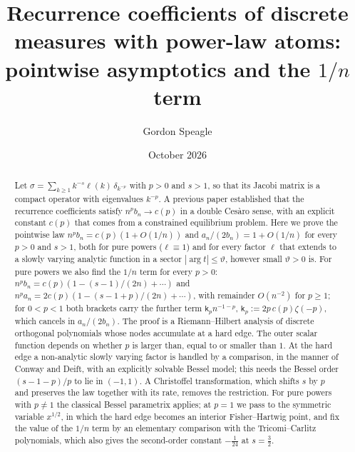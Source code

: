 
\title[Recurrence coefficients with power-law atoms]{Recurrence coefficients of discrete measures with power-law
atoms: pointwise asymptotics and the $1/n$ term}
\author{Gordon Speagle}
\date{October 2026}

\begin{abstract}
Let $\sigma=\sum_{k\ge1}k^{-s}\ell(k)\,\delta_{k^{-p}}$ with $p>0$ and $s>1$, so that its Jacobi matrix is a compact
operator with eigenvalues $k^{-p}$. A previous paper established that the recurrence coefficients satisfy
$n^pb_n\to c(p)$ in a double Ces\`aro sense, with an explicit constant $c(p)$ that comes from a constrained equilibrium
problem. Here we prove the pointwise law $n^pb_n=c(p)(1+O(1/n))$ and $a_n/(2b_n)=1+O(1/n)$ for every $p>0$ and $s>1$,
both for pure powers ($\ell\equiv1$) and for every factor $\ell$ that extends to a slowly varying analytic function in a
sector $|\arg t|\le\vartheta$, however small $\vartheta>0$ is. For pure powers we also find the $1/n$ term for every
$p>0$: $n^pb_n=c(p)(1-(s-1)/(2n)+\dotsb)$ and $n^pa_n=2c(p)(1-(s-1+p)/(2n)+\dotsb)$, with remainder $O(n^{-2})$ for
$p\ge1$; for $0<p<1$ both brackets carry the further term $\mathsf k_pn^{-1-p}$, $\mathsf k_p:=2p\,c(p)\zeta(-p)$,
which cancels in $a_n/(2b_n)$. The proof
is a Riemann--Hilbert analysis of discrete orthogonal polynomials whose nodes accumulate at a hard edge. The outer scalar
function depends on whether $p$ is larger than, equal to or smaller than $1$. At the hard edge a non-analytic slowly
varying factor is handled by a comparison, in the manner of Conway and Deift, with an explicitly solvable Bessel model;
this needs the Bessel order $(s-1-p)/p$ to lie in $(-1,1)$. A Christoffel transformation, which shifts $s$ by $p$ and
preserves the law together with its rate, removes the restriction. For pure powers with $p\ne1$ the classical Bessel
parametrix applies; at $p=1$ we pass to the symmetric variable $x^{1/2}$, in which the hard edge becomes an interior
Fisher--Hartwig point, and fix the value of the $1/n$ term by an elementary comparison with the Tricomi--Carlitz
polynomials, which also gives the second-order constant $-\frac1{24}$ at $s=\frac32$.
\end{abstract}

